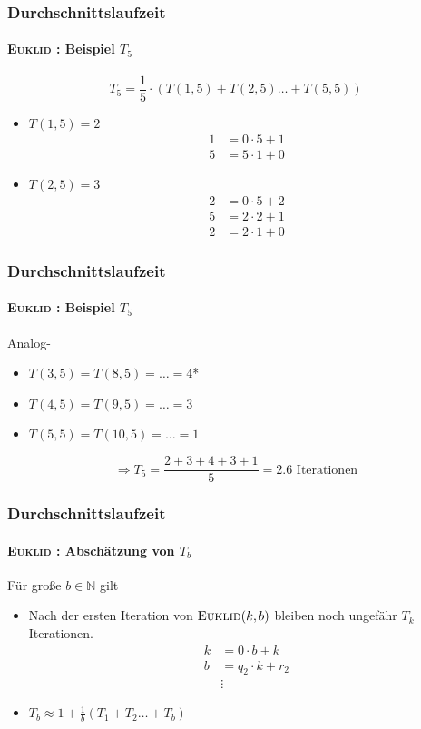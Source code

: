 \documentclass[•]{beamer}
\begin{document}
\begin{frame}	
		\frametitle{Durchschnittslaufzeit}
	\framesubtitle{\textsc{Euklid} : Beispiel $T_5$}
	\pause
$$T_5 = \frac{1}{5}\cdot (T(1,5) + T(2,5) \dots +T(5,5))$$	
\pause
	\begin{itemize}
	\item $T(1,5) = 2$
	\setcounter{equation}{0}
	\begin{align}
	1&=0\cdot 5 + 1	\\
	5&=5\cdot 1 + 0
	\end{align}
	\pause
	\setcounter{equation}{0}
	\item $T(2,5) = 3$
	\begin{align}
	2&=0\cdot 5 + 2	\\
	5&=2\cdot 2 + 1 \\
	2&= 2\cdot 1+0
	\end{align}
	\end{itemize}
	
	\end{frame}
	

\begin{frame}	
		\frametitle{Durchschnittslaufzeit}
	\framesubtitle{\textsc{Euklid} : Beispiel $T_5$}
	Analog-
	\begin{itemize}
	\item $T(3,5) = T(8,5) = \dots = 4$*
	\item $T(4,5) = T(9,5) = \dots = 3$
	\item $T(5,5) = T(10,5) = \dots = 1$
	\pause
	\end{itemize}
	\vspace{20pt}
	 $$\Rightarrow T_5 = \frac{2+3+4+3+1}{5} = 2.6\text{ Iterationen}$$
	\end{frame}	

	\begin{frame}	
		\frametitle{Durchschnittslaufzeit}
	\framesubtitle{\textsc{Euklid} : Absch\"atzung von $T_b$}
	\pause
	F\"ur gro{\ss}e $b \in \mathbb{N}$ gilt
	\begin{itemize}
	\item Nach der ersten Iteration von $\textsc{Euklid}(k,b)$ bleiben noch ungef\"ahr $T_{k}$ Iterationen.
	\pause
	\begin{align*}
	k&=0\cdot b + k\\
	b&=q_{2}\cdot k + r_2\\
	&\vdots
\end{align*}		
\pause
	\item $T_b \approx 1 + \frac{1}{b} (T_1 + T_2 \dots + T_{b})$
	\end{itemize}
\end{frame}		
\end{document}
